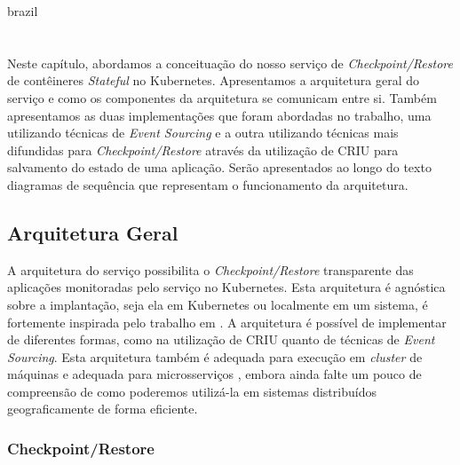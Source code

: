 

\begin{otherlanguage*}{brazil}

\chapter{}\label{cap:servico}

Neste capítulo, abordamos a conceituação do nosso serviço de
\textit{Checkpoint/Restore} de contêineres \textit{Stateful} no Kubernetes.
Apresentamos a arquitetura geral do serviço e como os componentes da arquitetura
se comunicam entre si. Também apresentamos as duas implementações que foram
abordadas no trabalho, uma utilizando técnicas de \textit{Event Sourcing} e a
outra utilizando técnicas mais difundidas para \textit{Checkpoint/Restore} através
da utilização de CRIU para salvamento do estado de uma aplicação. Serão apresentados
ao longo do texto diagramas de sequência que representam o funcionamento da
arquitetura.

\section{Arquitetura Geral}

A arquitetura do serviço possibilita o \textit{Checkpoint/Restore} transparente das
aplicações monitoradas pelo serviço no Kubernetes. Esta arquitetura é agnóstica sobre
a implantação, seja ela em Kubernetes ou localmente em um sistema, é fortemente inspirada
pelo trabalho em \cite{muller2022architecture}. A arquitetura é possível de implementar
de diferentes formas, como na utilização de CRIU quanto de técnicas de
\textit{Event Sourcing}. Esta arquitetura também é adequada para execução em
\textit{cluster} de máquinas e adequada para microsserviços \cite{vayghan2021kubernetes}
\cite{muller2022architecture} \cite{oh2018stateful}, embora ainda falte um pouco de
compreensão de como poderemos utilizá-la em sistemas distribuídos geograficamente
de forma eficiente.

\subsection{Checkpoint/Restore}


\end{otherlanguage*}
